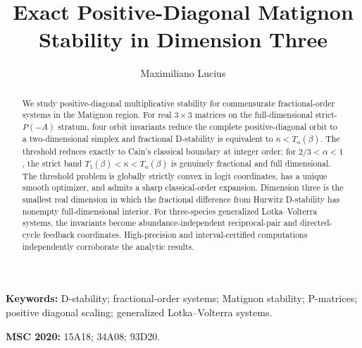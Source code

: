 \documentclass[11pt]{article}
\title{Exact Positive-Diagonal Matignon Stability in Dimension Three}
\author{Maximiliano Lucius}
\date{}
\theoremstyle{definition}\newtheorem{definition}[theorem]{Definition}
\theoremstyle{remark}\newtheorem{remark}[theorem]{Remark}
\begin{document}
\maketitle
\begin{abstract}
We study positive-diagonal multiplicative stability for commensurate fractional-order systems in the Matignon region. For real \(3\times3\) matrices on the full-dimensional strict-\(P(-A)\) stratum, four orbit invariants reduce the complete positive-diagonal orbit to a two-dimensional simplex and fractional D-stability is equivalent to \(\kappa<T_\alpha(\beta)\). The threshold reduces exactly to Cain's classical boundary at integer order; for \(2/3<\alpha<1\), the strict band \(T_1(\beta)<\kappa<T_\alpha(\beta)\) is genuinely fractional and full dimensional. The threshold problem is globally strictly convex in logit coordinates, has a unique smooth optimizer, and admits a sharp classical-order expansion. Dimension three is the smallest real dimension in which the fractional difference from Hurwitz D-stability has nonempty full-dimensional interior. For three-species generalized Lotka--Volterra systems, the invariants become abundance-independent reciprocal-pair and directed-cycle feedback coordinates. High-precision and interval-certified computations independently corroborate the analytic results.
\end{abstract}
\noindent\textbf{Keywords:} D-stability; fractional-order systems; Matignon stability; P-matrices; positive diagonal scaling; generalized Lotka--Volterra systems.

\medskip
\noindent\textbf{MSC 2020:} 15A18; 34A08; 93D20.












\end{document}
